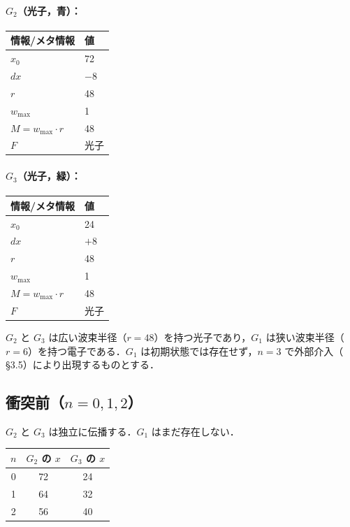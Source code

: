 \documentclass[12pt,a4paper]{ltjsarticle}
\begin{document}
\paragraph{$G_2$（光子，青）：}

\begin{table}[h]
\centering
\begin{tabular}{ll}
\toprule
情報/メタ情報 & 値 \\
\midrule
$x_0$ & 72 \\
$dx$ & $-8$ \\
$r$ & 48 \\
$w_{\max}$ & 1 \\
$M = w_{\max} \cdot r$ & 48 \\
$F$ & 光子 \\
\bottomrule
\end{tabular}
\end{table}

\paragraph{$G_3$（光子，緑）：}

\begin{table}[h]
\centering
\begin{tabular}{ll}
\toprule
情報/メタ情報 & 値 \\
\midrule
$x_0$ & 24 \\
$dx$ & $+8$ \\
$r$ & 48 \\
$w_{\max}$ & 1 \\
$M = w_{\max} \cdot r$ & 48 \\
$F$ & 光子 \\
\bottomrule
\end{tabular}
\end{table}

$G_2$ と $G_3$ は広い波束半径（$r = 48$）を持つ光子であり，$G_1$ は狭い波束半径（$r = 6$）を持つ電子である．$G_1$ は初期状態では存在せず，$n = 3$ で外部介入（\cite{ref2} \S3.5）により出現するものとする．

\subsection{衝突前（$n = 0, 1, 2$）}

$G_2$ と $G_3$ は独立に伝播する．$G_1$ はまだ存在しない．

\begin{table}[h]
\centering
\begin{tabular}{ccc}
\toprule
$n$ & $G_2$ の $x$ & $G_3$ の $x$ \\
\midrule
0 & 72 & 24 \\
1 & 64 & 32 \\
2 & 56 & 40 \\
\bottomrule
\end{tabular}
\end{table}
\end{document}
